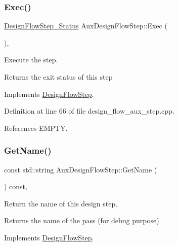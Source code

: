\subsubsection{\texorpdfstring{Exec()}{Exec()}}
{\footnotesize\ttfamily \hyperlink{design__flow__step_8hpp_afb1f0d73069c26076b8d31dbc8ebecdf}{Design\+Flow\+Step\+\_\+\+Status} Aux\+Design\+Flow\+Step\+::\+Exec (\begin{DoxyParamCaption}{ }\end{DoxyParamCaption})\hspace{0.3cm}{\ttfamily [override]}, {\ttfamily [virtual]}}



Execute the step. 

\begin{DoxyReturn}{Returns}
the exit status of this step 
\end{DoxyReturn}


Implements \hyperlink{classDesignFlowStep_a77d7e38493016766098711ea24f60b89}{Design\+Flow\+Step}.



Definition at line 66 of file design\+\_\+flow\+\_\+aux\+\_\+step.\+cpp.



References E\+M\+P\+TY.

\mbox{\label{classAuxDesignFlowStep_aada604a4981c38194ce791b2232e782c}} 
\subsubsection{\texorpdfstring{Get\+Name()}{GetName()}}
{\footnotesize\ttfamily const std\+::string Aux\+Design\+Flow\+Step\+::\+Get\+Name (\begin{DoxyParamCaption}{ }\end{DoxyParamCaption}) const\hspace{0.3cm}{\ttfamily [override]}, {\ttfamily [virtual]}}



Return the name of this design step. 

\begin{DoxyReturn}{Returns}
the name of the pass (for debug purpose) 
\end{DoxyReturn}


Implements \hyperlink{classDesignFlowStep_a01e5ebfab88db3b3b7f832f80075fad8}{Design\+Flow\+Step}.



